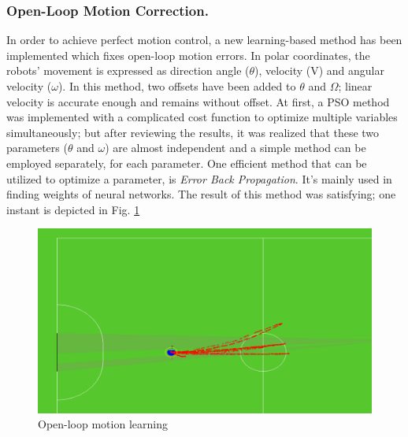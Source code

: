 \documentclass{llncs}
\begin{document}
 \subsubsection{Open-Loop Motion Correction.}
\label{subsubsec:OpenLoopMotionCorrection}
In order to achieve perfect motion control, a new learning-based method has been implemented which fixes open-loop motion errors.
In polar coordinates, the robots' movement is expressed as direction angle ($\theta$), velocity (V) and angular velocity ($\omega$). In this method, two offsets have been added to $\theta$ and $\Omega$; linear velocity is accurate enough and remains without offset.
\newline
At first, a PSO method was implemented with a complicated cost function to optimize multiple variables simultaneously; but after reviewing the results, it was realized that these two parameters ($\theta$ and $\omega$) are almost independent and a simple method can be employed separately, for each parameter.
\newline
One efficient method that can be utilized to optimize a parameter, is \textit{Error Back Propagation}. It's mainly used in finding weights of neural networks. The result of this method was satisfying; one instant is depicted in Fig. \ref{fig:control1}
\begin{figure}
\includegraphics[width=\textwidth]{img/f1}
\caption{Open-loop motion learning}
\label{fig:control1}
\end{figure}
\end{document}
